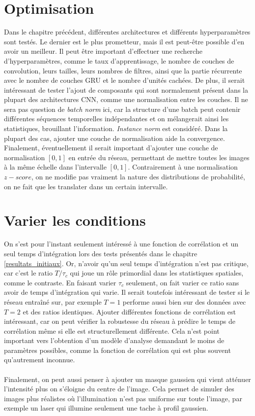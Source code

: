\documentclass[MSc,french]{ulthese}
\begin{document}
\section{Optimisation}
Dans le chapitre précédent, différentes architectures et différents hyperparamètres sont testés. Le dernier est le plus prometteur, mais il est peut-être possible d'en avoir un meilleur. Il peut être important d'effectuer une recherche d'hyperparamètres, comme le taux d'apprentissage, le nombre de couches de convolution, leurs tailles, leurs nombres de filtres, ainsi que la partie récurrente avec le nombre de couches GRU et le nombre d'unités cachées. De plus, il serait intéressant de tester l'ajout de composants qui sont normalement présent dans la plupart des architectures CNN, comme une normalisation entre les couches. Il ne sera pas question de \textit{batch norm} ici, car la structure d'une batch peut contenir différentes séquences temporelles indépendantes et on mélangerait ainsi les statistiques, brouillant l'information. \textit{Instance norm} est considéré. Dans la plupart des cas, ajouter une couche de normalisation aide la convergence. Finalement, éventuellement il serait important d'ajouter une couche de normalisation $[0, 1]$ en entrée du réseau, permettant de mettre toutes les images à la même échelle dans l'intervalle $[0, 1]$. Contrairement à une normalisation $z-score$, on ne modifie pas vraiment la nature des distributions de probabilité, on ne fait que les translater dans un certain intervalle.
\section{Varier les conditions}
On s'est pour l'instant seulement intéressé à une fonction de corrélation et un seul temps d'intégration lors des tests présentés dans le chapitre \ref{resultats_initiaux}. Or, n'avoir qu'un seul temps d'intégration n'est pas critique, car c'est le ratio $T/\tau_c$ qui joue un rôle primordial dans les statistiques spatiales, comme le contraste. En faisant varier $\tau_c$ seulement, on fait varier ce ratio sans avoir de temps d'intégration qui varie. Il serait toutefois intéressant de tester si le réseau entraîné sur, par exemple $T = 1$ performe aussi bien sur des données avec $T = 2$ et des ratios identiques. Ajouter différentes fonctions de corrélation est intéressant, car on peut vérifier la robustesse du réseau à prédire le temps de corrélation même si elle est structurellement différente. Cela n’est point important vers l'obtention d'un modèle d'analyse demandant le moins de paramètres possibles, comme la fonction de corrélation qui est plus souvent qu'autrement inconnue.
\\ \\
Finalement, on peut aussi penser à ajouter un masque gaussien qui vient atténuer l'intensité plus on s'éloigne du centre de l'image. Cela permet de simuler des images plus réalistes où l'illumination n'est pas uniforme sur toute l'image, par exemple un laser qui illumine seulement une tache à profil gaussien.
\end{document}
